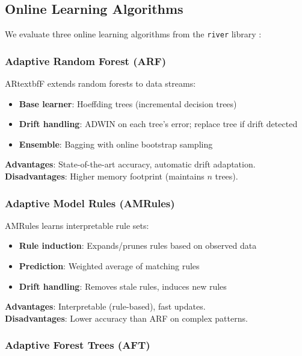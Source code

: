 \subsection{Online Learning Algorithms}

We evaluate three online learning algorithms from the \texttt{river} library \citep{montiel2021river}:

\subsubsection{Adaptive Random Forest (ARF)}

ARtextbf{F} \citep{gomes2017adaptive} extends random forests to data streams:

\begin{itemize}
    \item \textbf{Base learner}: Hoeffding trees (incremental decision trees)
    \item \textbf{Drift handling}: ADWIN on each tree's error; replace tree if drift detected
    \item \textbf{Ensemble}: Bagging with online bootstrap sampling
\end{itemize}

\noindent \textbf{Advantages}: State-of-the-art accuracy, automatic drift adaptation. \\
\textbf{Disadvantages}: Higher memory footprint (maintains $n$ trees).

\subsubsection{Adaptive Model Rules (AMRules)}

AMRules \citep{duarte2016adaptive} learns interpretable rule sets:

\begin{itemize}
    \item \textbf{Rule induction}: Expands/prunes rules based on observed data
    \item \textbf{Prediction}: Weighted average of matching rules
    \item \textbf{Drift handling}: Removes stale rules, induces new rules
\end{itemize}

\noindent \textbf{Advantages}: Interpretable (rule-based), fast updates. \\
\textbf{Disadvantages}: Lower accuracy than ARF on complex patterns.

\subsubsection{Adaptive Forest Trees (AFT)}

